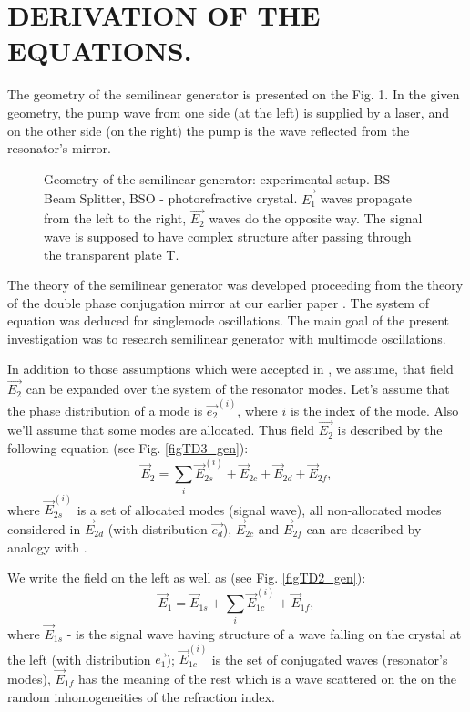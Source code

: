 
\section{DERIVATION OF THE EQUATIONS.}

\noindent The geometry of the semilinear generator is
presented on the Fig. 1. In the given geometry, the pump wave from
one side (at the left) is supplied by a laser, and on the other
side (on the right) the pump is the wave reflected from the
resonator's mirror.

\begin{figure}
\centering

\label{semi} \caption{\footnotesize Geometry of the semilinear
generator: experimental setup. BS - Beam Splitter, BSO -
photorefractive crystal. $\vec{E_1}$ waves propagate from the left
to the right, $\vec{E_2}$ waves do the opposite way. The signal
wave is supposed to have complex structure after passing through
the transparent plate T.}
\end{figure}

The theory of the semilinear generator was developed
proceeding from the theory of the double phase conjugation mirror
\cite{ourDPCM} at our earlier paper \cite{ourSemi}. The system of
equation \cite{ourSemi} was deduced for singlemode oscillations.  The
main goal  of the present investigation was to research semilinear
generator with multimode oscillations. 



In addition to those assumptions which were accepted in
\cite{ourSemi}, we assume, that field $\vec{E_2}$ can be expanded over
the system of the resonator modes. Let's assume that the phase
distribution of a mode is $\vec{e_2}^{(i)}$, where $i$ is the index of
the mode. Also we'll assume that some modes are
allocated. Thus field $\vec{E_2}$ is  described by the following
equation (see Fig.
\ref{figTD3_gen}):
\[ 
\vec{E}_2=\sum_i \vec{E}_{2s}^{(i)} +\vec{E}_{2c} + \vec{E}_{2d} + \vec{E}_{2f}, 
\] 
\noindent where $\vec{E}_{2s}^{(i)}$ is a set of allocated modes
(signal wave), all
non-allocated modes considered in $\vec{E}_{2d}$ (with distribution
$\vec{e_d}$),  $\vec{E}_{2c}$ and
$\vec{E}_{2f}$ can are described by analogy with \cite{ourSemi}.



We write the field on the left as well as \cite{ourSemi}(see Fig.
\ref{figTD2_gen}):
\[
\vec{E}_1=\vec{E}_{1s}+\sum_i \vec{E}_{1c}^{(i)}+\vec{E}_{1f}, 
\]
\noindent where $\vec{E}_{1s}$ - is the signal wave having
structure of a wave falling on the crystal at the left (with
distribution $\vec {e_1}$); $\vec {E}_{1c}^{(i)}$ is the set of
conjugated waves (resonator's modes), $\vec {E}_{1f}$ has the meaning 
of the rest which is a wave scattered on
the on the random inhomogeneities of the refraction index.

